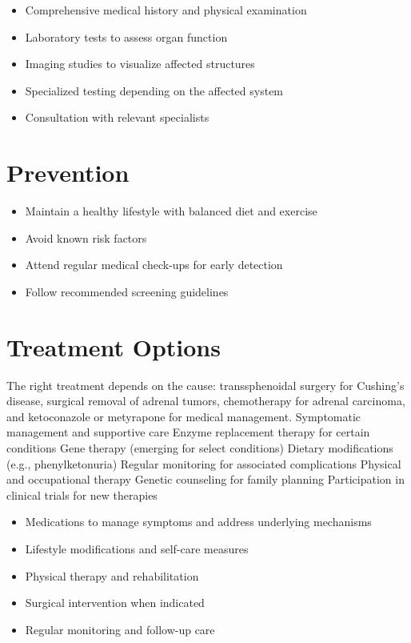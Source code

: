 \begin{itemize}[noitemsep]
  \item Comprehensive medical history and physical examination
  \item Laboratory tests to assess organ function
  \item Imaging studies to visualize affected structures
  \item Specialized testing depending on the affected system
  \item Consultation with relevant specialists
\end{itemize}
\section{Prevention}
\begin{itemize}[noitemsep]
  \item Maintain a healthy lifestyle with balanced diet and exercise
  \item Avoid known risk factors
  \item Attend regular medical check-ups for early detection
  \item Follow recommended screening guidelines
\end{itemize}
\section{Treatment Options}
The right treatment depends on the cause: transsphenoidal surgery for Cushing's disease, surgical removal of adrenal tumors, chemotherapy for adrenal carcinoma, and ketoconazole or metyrapone for medical management. Symptomatic management and supportive care Enzyme replacement therapy for certain conditions Gene therapy (emerging for select conditions) Dietary modifications (e.g., phenylketonuria) Regular monitoring for associated complications Physical and occupational therapy Genetic counseling for family planning Participation in clinical trials for new therapies

\begin{itemize}[noitemsep]
  \item Medications to manage symptoms and address underlying mechanisms
  \item Lifestyle modifications and self-care measures
  \item Physical therapy and rehabilitation
  \item Surgical intervention when indicated
  \item Regular monitoring and follow-up care
\end{itemize}
